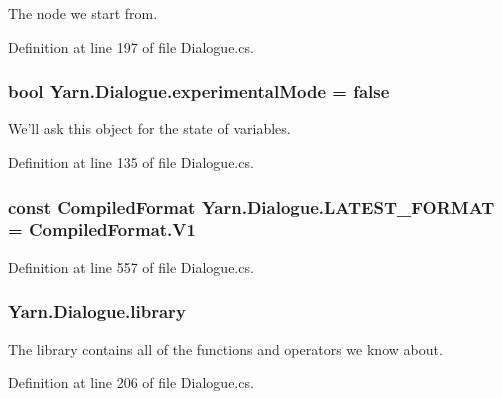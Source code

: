 The node we start from. 



Definition at line 197 of file Dialogue.\-cs.

\hypertarget{a00092_a2a5ac23441861eef13c59044cc218f09}{
\subsubsection[{experimental\-Mode}]{\setlength{\rightskip}{0pt plus 5cm}bool Yarn.\-Dialogue.\-experimental\-Mode = false}}\label{a00092_a2a5ac23441861eef13c59044cc218f09}


We'll ask this object for the state of variables. 



Definition at line 135 of file Dialogue.\-cs.

\hypertarget{a00092_a3bc83587462ade6a2f7f42cb7576e50e}{
\subsubsection[{L\-A\-T\-E\-S\-T\-\_\-\-F\-O\-R\-M\-A\-T}]{\setlength{\rightskip}{0pt plus 5cm}const {\bf Compiled\-Format} Yarn.\-Dialogue.\-L\-A\-T\-E\-S\-T\-\_\-\-F\-O\-R\-M\-A\-T = Compiled\-Format.\-V1}}\label{a00092_a3bc83587462ade6a2f7f42cb7576e50e}


Definition at line 557 of file Dialogue.\-cs.

\hypertarget{a00092_ae660d4cfb6e296358d2f61d8ee74c66a}{
\subsubsection[{library}]{ Yarn.\-Dialogue.\-library}}\label{a00092_ae660d4cfb6e296358d2f61d8ee74c66a}


The library contains all of the functions and operators we know about. 



Definition at line 206 of file Dialogue.\-cs.



